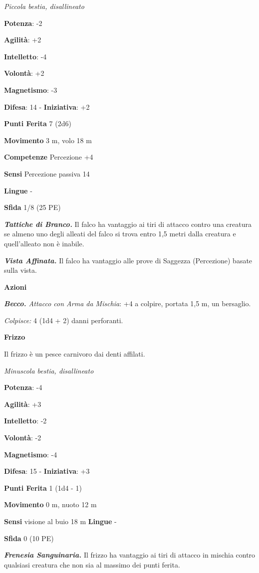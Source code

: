 \begin{multicols}{2}
\emph{Piccola bestia, disallineato}

\textbf{Potenza}: -2

\textbf{Agilità}: +2

\textbf{Intelletto}: -4

\textbf{Volontà}: +2

\textbf{Magnetismo}: -3

\textbf{Difesa}: 14 - \textbf{Iniziativa}: +2

\textbf{Punti Ferita} 7 (2d6)

\textbf{Movimento} 3 m, volo 18 m

\textbf{Competenze} Percezione +4

\textbf{Sensi} Percezione passiva 14

\textbf{Lingue} -

\textbf{Sfida} 1/8 (25 PE)

\emph{\textbf{Tattiche di Branco.}} Il falco ha vantaggio ai tiri di
attacco contro una creatura se almeno uno degli alleati del falco si
trova entro 1,5 metri dalla creatura e quell'alleato non è inabile.

\emph{\textbf{Vista Affinata.}} Il falco ha vantaggio alle prove di
Saggezza (Percezione) basate sulla vista.

\textbf{Azioni}

\emph{\textbf{Becco.} Attacco con Arma da Mischia}: +4 a colpire,
portata 1,5 m, un bersaglio.

\emph{Colpisce:} 4 (1d4 + 2) danni perforanti.



\textbf{Frizzo}

Il frizzo è un pesce carnivoro dai denti affilati.

\emph{Minuscola bestia, disallineato}

\textbf{Potenza}: -4

\textbf{Agilità}: +3

\textbf{Intelletto}: -2

\textbf{Volontà}: -2

\textbf{Magnetismo}: -4

\textbf{Difesa}: 15 - \textbf{Iniziativa}: +3

\textbf{Punti Ferita} 1 (1d4 - 1)

\textbf{Movimento} 0 m, nuoto 12 m

\textbf{Sensi} visione al buio 18 m
\textbf{Lingue} -

\textbf{Sfida} 0 (10 PE)

\emph{\textbf{Frenesia Sanguinaria.}} Il frizzo ha vantaggio ai tiri di
attacco in mischia contro qualsiasi creatura che non sia al massimo dei
punti ferita.


\end{multicols}
